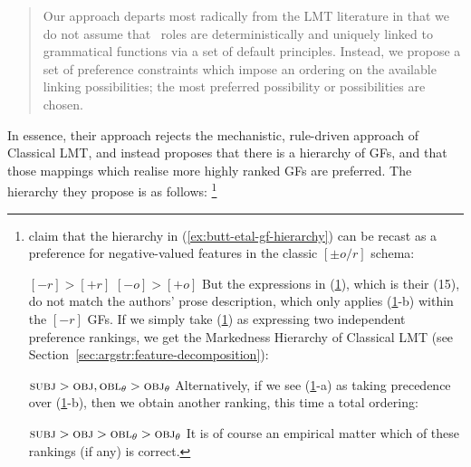 \documentclass[output=paper]{langscibook}
\begin{document}
\begin{quote}
  Our approach departs most radically from the LMT literature in that we do not
  assume that \astruc\ roles are deterministically and uniquely linked to
  grammatical functions via a set of default principles. Instead, we propose a
  set of preference constraints which impose an ordering on the available
  linking possibilities; the most preferred possibility or possibilities are
  chosen.
\end{quote}
%
\largerpage[-1]
In essence, their approach rejects the mechanistic, rule-driven approach of
Classical LMT, and instead proposes that there is a hierarchy of GFs, and that
those mappings which realise more highly ranked GFs are preferred. The hierarchy
they propose is as follows:%
%
\footnote{\citet[7]{butt1997architecture} claim that the hierarchy in
  (\ref{ex:butt-etal-gf-hierarchy}) can be recast as a preference for
  negative-valued features in the classic $[\pm o/r]$ schema:

  \ea\label{ex:butt-etal-feature-rankings}%
  \ea $[-r] > [+r]$%
  \ex $[-o] > [+o]$%
  \z%
  \z
  But the expressions in (\ref{ex:butt-etal-feature-rankings}), which is their
  (15), do not match the authors' prose description, which only applies
  (\ref{ex:butt-etal-feature-rankings}-b) within the $[-r]$ GFs. If we simply
  take (\ref{ex:butt-etal-feature-rankings}) as expressing two independent
  preference rankings, we get the Markedness Hierarchy of Classical LMT (see
  Section~\ref{sec:argstr:feature-decomposition}):

  \ea\label{ex:butt-etal-gf-hierarchy-total}%
  $\textsc{subj}{} > \textsc{obj}{}, \mbox{\textsc{obl}$_{\theta}$}{} > \mbox{\textsc{obj}$_{\theta}$}{}$%
  \z
  Alternatively, if we see (\ref{ex:butt-etal-feature-rankings}-a) as taking
  precedence over (\ref{ex:butt-etal-feature-rankings}-b), then we obtain
  another ranking, this time a total ordering:

  \ea $\textsc{subj}{} > \textsc{obj}{} > \mbox{\textsc{obl}$_{\theta}$}{} > \mbox{\textsc{obj}$_{\theta}$}{}$ \z
%
  It is of course an empirical matter which of these rankings (if any) is
  correct.}
%
\end{document}
